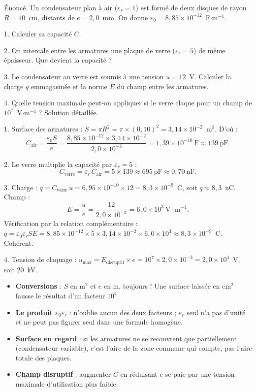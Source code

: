 \documentclass[11pt]{article}
\begin{document}
\begin{exoresolu}
Énoncé. Un condensateur plan à air ($\varepsilon_r = 1$) est formé de deux disques de rayon $R = 10$~cm, distants de $e = 2{,}0$~mm. On donne $\varepsilon_0 = 8{,}85\times 10^{-12}$~F$\cdot$m$^{-1}$.

1. Calculer sa capacité $C$.

2. On intercale entre les armatures une plaque de verre ($\varepsilon_r = 5$) de même épaisseur. Que devient la capacité ?

3. Le condensateur au verre est soumis à une tension $u = 12$~V. Calculer la charge $q$ emmagasinée et la norme $E$ du champ entre les armatures.

4. Quelle tension maximale peut-on appliquer si le verre claque pour un champ de $10^{7}$~V$\cdot$m$^{-1}$ ?
\tcblower
Solution détaillée.

1. Surface des armatures : $S = \pi R^2 = \pi \times (0{,}10)^2 = 3{,}14\times 10^{-2}$~m$^2$. D'où :
\[ C_{\text{air}} = \dfrac{\varepsilon_0 S}{e} = \dfrac{8{,}85\times 10^{-12}\times 3{,}14\times 10^{-2}}{2{,}0\times 10^{-3}} = 1{,}39\times 10^{-10}\ \mathrm{F} \approx 139\ \mathrm{pF}. \]

2. Le verre multiplie la capacité par $\varepsilon_r = 5$ :
\[ C_{\text{verre}} = \varepsilon_r\, C_{\text{air}} = 5\times 139 \approx 695\ \mathrm{pF} \approx 0{,}70\ \mathrm{nF}. \]

3. Charge : $q = C_{\text{verre}}\, u = 6{,}95\times 10^{-10}\times 12 = 8{,}3\times 10^{-9}$~C, soit $q \approx 8{,}3$~nC. Champ :
\[ E = \dfrac{u}{e} = \dfrac{12}{2{,}0\times 10^{-3}} = 6{,}0\times 10^{3}\ \mathrm{V\cdot m^{-1}}. \]
Vérification par la relation complémentaire : $q = \varepsilon_0 \varepsilon_r S E = 8{,}85\times 10^{-12}\times 5\times 3{,}14\times 10^{-2}\times 6{,}0\times 10^{3} \approx 8{,}3\times 10^{-9}$~C. Cohérent.

4. Tension de claquage : $u_{\max} = E_{\text{disruptif}}\times e = 10^{7}\times 2{,}0\times 10^{-3} = 2{,}0\times 10^{4}$~V, soit $20$~kV.
\end{exoresolu}

\begin{attention}
\begin{itemize}
\item \textbf{Conversions} : $S$ en m$^2$ et $e$ en m, toujours ! Une surface laissée en cm$^2$ fausse le résultat d'un facteur $10^{4}$.
\item \textbf{Le produit $\varepsilon_0 \varepsilon_r$} : n'oublie aucun des deux facteurs ; $\varepsilon_r$ seul n'a pas d'unité et ne peut pas figurer seul dans une formule homogène.
\item \textbf{Surface en regard} : si les armatures ne se recouvrent que partiellement (condensateur variable), c'est l'aire de la zone commune qui compte, pas l'aire totale des plaques.
\item \textbf{Champ disruptif} : augmenter $C$ en réduisant $e$ se paie par une tension maximale d'utilisation plus faible.
\end{itemize}
\end{attention}
\end{document}
